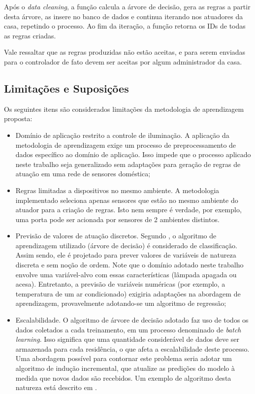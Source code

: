 Após o \textit{data cleaning}, a função calcula a árvore de decisão, gera as regras a partir desta árvore, as insere no banco de dados e continua iterando nos atuadores da casa, repetindo o processo. Ao fim da iteração, a função retorna os IDs de todas as regras criadas.

Vale ressaltar que as regras produzidas não estão aceitas, e para serem enviadas para o controlador de fato devem ser aceitas por algum administrador da casa.

\subsection{Limitações e Suposições} \label{subsec:limit_aprendizgem}
Os seguintes itens são considerados limitações da metodologia de aprendizagem proposta:

\begin{itemize}
	\item Domínio de aplicação restrito a controle de iluminação. A aplicação da metodologia de aprendizagem exige um processo de preprocessamento de dados específico ao domínio de aplicação. Isso impede que o processo aplicado neste trabalho seja generalizado sem adaptações para geração de regras de atuação em uma rede de sensores doméstica;
	\item Regras limitadas a dispositivos no mesmo ambiente. A metodologia implementado seleciona apenas sensores que estão no mesmo ambiente do atuador para a criação de regras. Isto nem sempre é verdade, por exemplo, uma porta pode ser acionada por sensores de 2 ambientes distintos. 
	\item Previsão de valores de atuação discretos. Segundo \cite{han2005}, o algoritmo de aprendizagem utilizado (árvore de decisão) é considerado de classificação. Assim sendo, ele é projetado para prever valores de variáveis de natureza discreta e sem noção de ordem. Note que o domínio adotado neste trabalho envolve uma variável-alvo com essas características (lâmpada apagada ou acesa). Entretanto, a previsão de variáveis numéricas (por exemplo, a temperatura de um ar condicionado) exigiria adaptações na abordagem de aprendizagem, provavelmente adotando-se um algoritmo de regressão;
	\item Escalabilidade. O algoritmo de árvore de decisão adotado faz uso de todos os dados coletados a cada treinamento, em um processo denominado de \textit{batch learning}. Isso significa que uma quantidade considerável de dados deve ser armazenada para cada residência, o que afeta a escalabilidade deste processo. Uma abordagem possível para contornar este problema seria adotar um algoritmo de indução incremental, que atualize as predições do modelo à medida que novos dados são recebidos. Um exemplo de algoritmo desta natureza está descrito em \cite{utgoff1989}.
\end{itemize}
